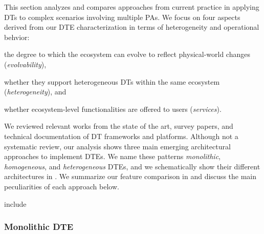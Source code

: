 This section analyzes and compares approaches from current practice in applying \acp{DT} to complex scenarios involving multiple \acp{PA}.
We focus on four aspects derived from our \ac{DTE} characterization in terms of heterogeneity and operational behvior:
\begin{inlinelist}
\item the degree to which the ecosystem can evolve to reflect physical-world changes (\emph{evolvability}),
\item whether they support heterogeneous \acp{DT} within the same ecosystem (\emph{heterogeneity}),
and 
\item whether ecosystem-level functionalities are offered to users (\emph{services}).
\end{inlinelist}

We reviewed relevant works from the state of the art, survey papers, and technical documentation of \ac{DT} frameworks and platforms.
Although not a systematic review, our analysis shows three main emerging architectural approaches to implement \acp{DTE}.
%
We name these patterns \emph{monolithic}, \emph{homogeneous}, and \emph{heterogeneous} \acp{DTE}, and we schematically show their different architectures in .
We summarize our feature comparison in  and discuss the main peculiarities of each approach below.



include\subsubsection{Monolithic \acl{DTE}}
\label{sssec:monolithic}

